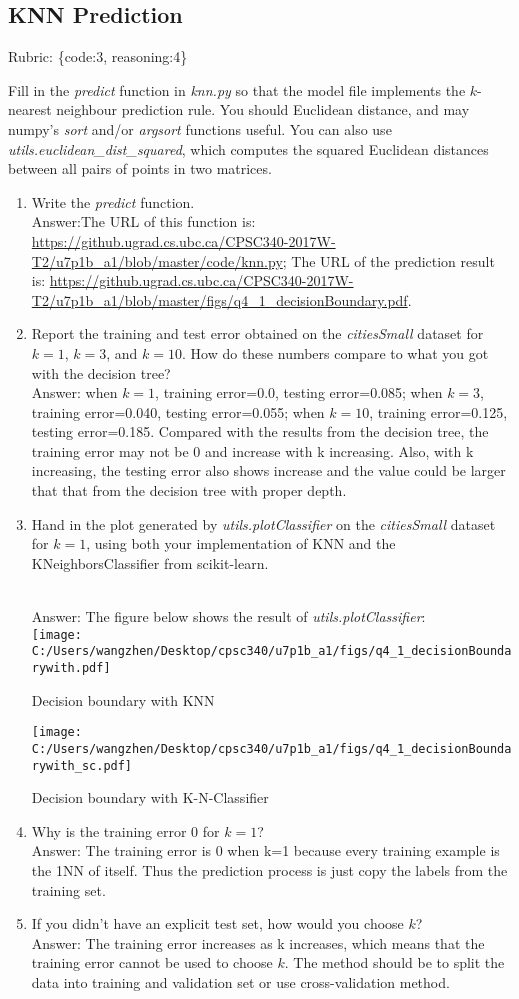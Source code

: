 \documentclass{article}
\def\blu#1{{\color{blu}#1}}
\def\gre#1{{\color{gre}#1}}
\def\enum#1{\begin{enumerate}#1\end{enumerate}}
\def\rubric#1{\gre{Rubric: \{#1\}}}{}
\begin{document}
\subsection{KNN Prediction}
\rubric{code:3, reasoning:4}

Fill in the \emph{predict} function in \emph{knn.py} so that the model file implements the $k$-nearest neighbour prediction rule.
You should Euclidean distance, and may numpy's \emph{sort} and/or \emph{argsort} functions useful.
You can also use \emph{utils.euclidean\_dist\_squared}, which computes the squared Euclidean distances between all pairs of points in two matrices.
\blu{
\enum{
\item Write the \emph{predict} function.
\textcolor{gre}{
\\Answer:The URL of this function is: \url{https://github.ugrad.cs.ubc.ca/CPSC340-2017W-T2/u7p1b_a1/blob/master/code/knn.py}; The URL of the prediction result is: \url{https://github.ugrad.cs.ubc.ca/CPSC340-2017W-T2/u7p1b_a1/blob/master/figs/q4_1_decisionBoundary.pdf}.}
\item Report  the training and test error obtained on the \emph{citiesSmall} dataset for $k=1$, $k=3$, and $k=10$. How do these numbers compare to what you got with the decision tree?
\textcolor{gre}{
\\Answer: when $k=1$, training error=0.0, testing error=0.085; when $k=3$, training error=0.040, testing error=0.055; when $k=10$, training error=0.125, testing error=0.185. Compared with the results from the decision tree, the training error may not be 0 and increase with k increasing. Also, with k increasing, the testing error also shows increase and the value could be larger that that from the decision tree with proper depth.}
\item Hand in the plot generated by \emph{utils.plotClassifier} on the \emph{citiesSmall} dataset for $k=1$, using both your implementation of KNN and the KNeighborsClassifier from scikit-learn.
\textcolor{gre}{
\\Answer: The figure below shows the result of \emph{utils.plotClassifier}:\\ \texttt{[image: C:/Users/wangzhen/Desktop/cpsc340/u7p1b\_a1/figs/q4\_1\_decisionBoundarywith.pdf]}
\caption{Decision boundary with KNN}
\texttt{[image: C:/Users/wangzhen/Desktop/cpsc340/u7p1b\_a1/figs/q4\_1\_decisionBoundarywith\_sc.pdf]}
\caption{Decision boundary with K-N-Classifier}}
\item Why is the training error $0$ for $k=1$?
\textcolor{gre}{
\\Answer: The training error is 0 when k=1 because every training example is the 1NN of itself. Thus the prediction process is just copy the labels from the training set.}
\item If you didn't have an explicit test set, how would you choose $k$?
\textcolor{gre}{\\Answer: The training error increases as k increases, which means that the training error cannot be used to choose $k$. The method should be to split the data into training and validation set or use cross-validation method.}
}}
\end{document}
